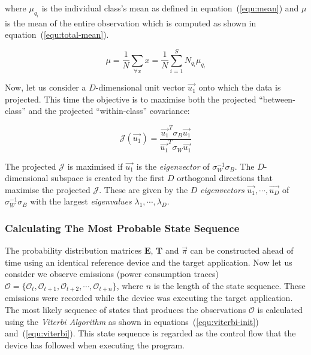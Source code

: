 \documentclass[lnicst]{svmultln}
\begin{document}
where $\mu_{q_{i}}$ is the individual class's mean as defined in equation~(\ref{equ:mean}) and $\mu$ is the mean of the entire observation which is computed as shown in equation~(\ref{equ:total-mean}).

\begin{equation}
\mu = \frac{1}{N} \sum \limits_{\forall x} x = \frac{1}{N} \sum \limits_{i=1}^{S} N_{q_{i}} \mu_{q_{i}}
\label{equ:total-mean}
\end{equation}

Now, let us consider a $D$-dimensional unit vector $\overrightarrow{u_{1}}$ onto which the data is projected. This time the objective is to maximise both the projected ``between-class'' and the projected ``within-class'' covariance:

\begin{equation}
\mathcal{J}(\overrightarrow{u_{1}}) = \frac{\overrightarrow{u_{1}}^{T}\sigma_{B}\overrightarrow{u_{1}}}{\overrightarrow{u_{1}}^{T}\sigma_{W}\overrightarrow{u_{1}}}
\label{equ:covariance-ratio}
\end{equation}

The projected $\mathcal{J}$ is maximised if $\overrightarrow{u_{1}}$ is the \emph{eigenvector} of $\sigma_{W}^{-1}\sigma_{B}$. The $D$-dimensional subspace is created by the first $D$ orthogonal directions that maximise the projected $\mathcal{J}$. These are given by the $D$ \emph{eigenvectors} $\overrightarrow{u_{1}}, \cdots, \overrightarrow{u_{D}}$ of $\sigma_{W}^{-1}\sigma_{B}$ with the largest \emph{eigenvalues} $\lambda_{1}, \cdots, \lambda_{D}$.

\subsubsection{Calculating The Most Probable State Sequence}
\label{subsubsec:state-seq}

The probability distribution matrices $\mathbf{E}$, $\mathbf{T}$ and $\vec{\pi}$ can be constructed ahead of time using an identical reference device and the target application. Now let us consider we observe emissions (power consumption traces) $\mathcal{O}=\{ \mathcal{O}_{t}, \mathcal{O}_{t+1}, \mathcal{O}_{t+2}, \cdots, \mathcal{O}_{t+n} \}$, where $n$ is the length of the state sequence. These emissions were recorded while the device was executing the target application. The most likely sequence of states that produces the observations $\mathcal{O}$ is calculated using the \emph{Viterbi Algorithm} \cite{CoRR-05-D} as shown in equations~(\ref{equ:viterbi-init}) and~(\ref{equ:viterbi}). This state sequence is regarded as the control flow that the device has followed when executing the program.
\end{document}
